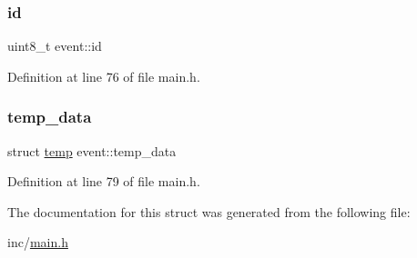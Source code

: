 \subsubsection{\texorpdfstring{id}{id}}
{\footnotesize\ttfamily uint8\+\_\+t event\+::id}



Definition at line 76 of file main.\+h.

\mbox{\label{structevent_a1091ebe2b1484f3e99aedb48a4b01514}} 
\subsubsection{\texorpdfstring{temp\+\_\+data}{temp\_data}}
{\footnotesize\ttfamily struct \hyperlink{structtemp}{temp} event\+::temp\+\_\+data}



Definition at line 79 of file main.\+h.



The documentation for this struct was generated from the following file\+:\begin{DoxyCompactItemize}
\item 
inc/\hyperlink{main_8h}{main.\+h}\end{DoxyCompactItemize}
